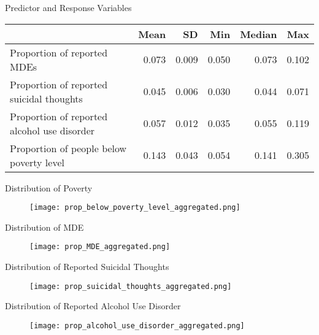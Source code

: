 \documentclass{beamer}
\begin{document}
\begin{frame}{Predictor and Response Variables}
\begin{table}[t]
\tiny
\begin{center}
\begin{tabular}{l r r r r r}
    \toprule
    & Mean & SD & Min & Median & Max\\
    \midrule
    Proportion of reported MDEs & 0.073 & 0.009 & 0.050 & 0.073 & 0.102\\
    Proportion of reported suicidal thoughts & 0.045 & 0.006 & 0.030 & 0.044 & 0.071\\
    Proportion of reported alcohol use disorder & 0.057 & 0.012 & 0.035 & 0.055 & 0.119\\
    Proportion of people below poverty level & 0.143 & 0.043 & 0.054 & 0.141 & 0.305\\
    \bottomrule
\end{tabular}
\end{center}
\end{table}
\end{frame}

\begin{frame}{Distribution of Poverty}
\begin{figure}[!htb]
    \centering
    \texttt{[image: prop\_below\_poverty\_level\_aggregated.png]}
\end{figure}
\end{frame}

\begin{frame}{Distribution of MDE}
\begin{figure}[!htb]
    \centering
    \texttt{[image: prop\_MDE\_aggregated.png]}
\end{figure}
\end{frame}

\begin{frame}{Distribution of Reported Suicidal Thoughts}
\begin{figure}[!htb]
    \centering
    \texttt{[image: prop\_suicidal\_thoughts\_aggregated.png]}
\end{figure}
\end{frame}

\begin{frame}{Distribution of Reported Alcohol Use Disorder}
\begin{figure}[!htb]
    \centering
    \texttt{[image: prop\_alcohol\_use\_disorder\_aggregated.png]}
\end{figure}
\end{frame}
\end{document}
